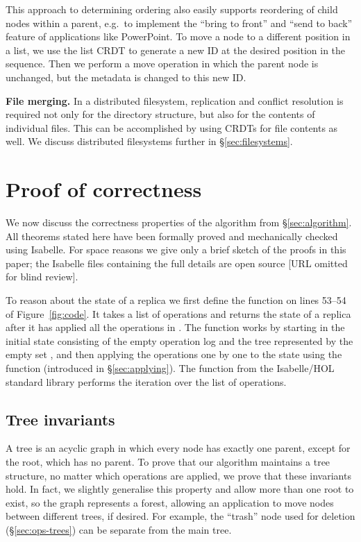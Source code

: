 \documentclass[sigplan,anonymous]{acmart}
\begin{document}
This approach to determining ordering also easily supports reordering of child nodes within a parent, e.g.\ to implement the ``bring to front'' and ``send to back'' feature of applications like PowerPoint.
To move a node to a different position in a list, we use the list CRDT to generate a new ID at the desired position in the sequence.
Then we perform a move operation in which the parent node is unchanged, but the metadata is changed to this new ID.

\smallbreak\noindent\textbf{File merging.}
In a distributed filesystem, replication and conflict resolution is required not only for the directory structure, but also for the contents of individual files.
This can be accomplished by using CRDTs for file contents as well.
We discuss distributed filesystems further in \S\ref{sec:filesystems}.

\section{Proof of correctness}\label{sec:proof}

We now discuss the correctness properties of the algorithm from \S\ref{sec:algorithm}.
All theorems stated here have been formally proved and mechanically checked using Isabelle.
For space reasons we give only a brief sketch of the proofs in this paper; the Isabelle files containing the full details are open source [URL omitted for blind review].


To reason about the state of a replica we first define the function  on lines 53--54 of Figure~\ref{fig:code}.
It takes a list of operations  and returns the state of a replica after it has applied all the operations in .
The  function works by starting in the initial state \isa{([], \{\})} consisting of the empty operation log \isa{[]} and the tree represented by the empty set \isa{\{\}}, and then applying the operations one by one to the state using the  function (introduced in \S\ref{sec:applying}).
The  function from the Isabelle/HOL standard library performs the iteration over the list of operations.

\subsection{Tree invariants}\label{sec:tree-invariants}

A tree is an acyclic graph in which every node has exactly one parent, except for the root, which has no parent.
To prove that our algorithm maintains a tree structure, no matter which operations are applied, we prove that these invariants hold.
In fact, we slightly generalise this property and allow more than one root to exist, so the graph represents a forest, allowing an application to move nodes between different trees, if desired.
For example, the ``trash'' node used for deletion (\S\ref{sec:ops-trees}) can be separate from the main tree.
\end{document}
